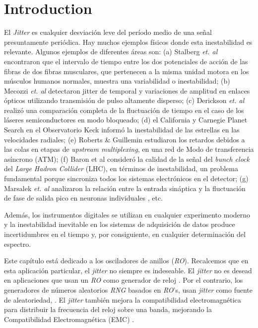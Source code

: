 \section{Introduction}
\label{sec:intro}

El \emph{Jitter} es cualquier desviación leve del período medio de una señal presuntamente periódica.
Hay muchos ejemplos físicos donde esta inestabilidad es relevante.
Algunos ejemplos de diferentes áreas son:
(a) Stalberg \textit{et. al} \cite{Stalberg1971} encontraron que el intervalo de tiempo entre los dos potenciales de acción de las fibras de dos fibras musculares, que pertenecen a la misma unidad motora en los músculos humanos normales, muestra una variabilidad o inestabilidad;
(b) Mecozzi \textit{et. al} \cite{Mecozzi2001} detectaron jitter de temporal y variaciones de amplitud en enlaces ópticos utilizando transmisión de pulso altamente disperso;
(c) Derickson \textit{et. al} \cite{Derickson1991} realizó una comparación completa de la fluctuación de tiempo en el caso de los láseres semiconductores en modo bloqueado;
(d) el California y Carnegie Planet Search en el Observatorio Keck \cite{Wright2005} informó la inestabilidad de las estrellas en las velocidades radiales;
(e) Roberts \& Guillemin estudiaron los retardos debidos a las colas en etapas de \textit{upstream multiplexing}, en una red de Modo de transferencia asíncrono (ATM);
(f) Baron et al \cite{Baron2012} consideró la calidad de la señal del \textit{bunch clock} del \textit{Large Hadron Collider} (LHC), en términos de inestabilidad, un problema fundamental porque sincroniza todos los sistemas electrónicos en el detector;
(g) Marsalek \textit{et. al} analizaron la relación entre la entrada sináptica y la fluctuación de fase de salida pico en neuronas individuales \cite{Marsalek1997}, etc.

Además, los instrumentos digitales se utilizan en cualquier experimento moderno y la inestabilidad inevitable en los sistemas de adquisición de datos produce incertidumbres en el tiempo y, por consiguiente, en cualquier determinación del espectro.

Este capítulo está dedicado a los osciladores de anillos (\emph{RO}).
Recalcemos que en esta aplicación particular, el \textit{jitter} no siempre es indeseable.
El \textit{jitter} no es desead en aplicaciones que usan un \emph{RO} como generador de reloj \cite{Buedo1998, Beomsup1990, Hajimiri1999, Mandal2010, Gupta2011}.
Por el contrario, los generadores de números aleatorios \emph{RNG} basados en \emph{RO}'s, usan \textit{jitter} como fuente de aleatoriedad, \cite{Sunar2007, Wold2009}.
El \textit{jitter} también mejora la compatibilidad electromagnética para distribuir la frecuencia del reloj sobre una banda, mejorando la Compatibilidad Electromagnética (EMC) \cite{DeMicco2012}.

